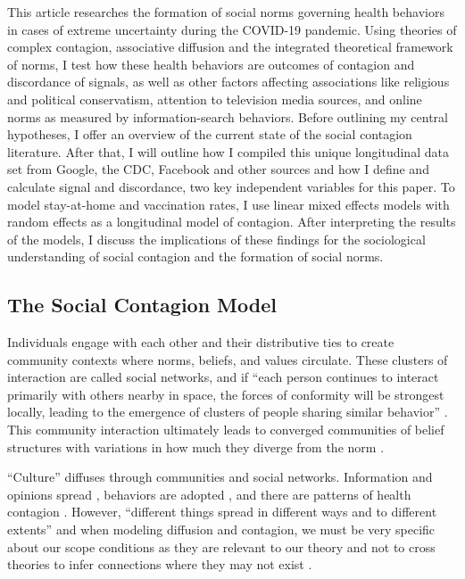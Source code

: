 This article researches the formation of social norms governing health behaviors
in cases of extreme uncertainty during the COVID-19 pandemic. Using theories of
complex contagion, associative diffusion and the integrated theoretical
framework of norms, I test how these health behaviors are outcomes of contagion
and discordance of signals, as well as other factors affecting associations like
religious and political conservatism, attention to television media sources, and
online norms as measured by information-search behaviors. Before outlining my
central hypotheses, I offer an overview of the current state of the social
contagion literature. After that, I will outline how I compiled this unique
longitudinal data set from Google, the CDC, Facebook and other sources and how I
define and calculate signal and discordance, two key independent variables for
this paper. To model stay-at-home and vaccination rates, I use linear mixed
effects models with random effects as a longitudinal model of contagion. After
interpreting the results of the models, I discuss the implications of these
findings for the sociological understanding of social contagion and the
formation of social norms.

\hypertarget{the-social-contagion-model}{\subsection{The Social Contagion Model}\label{the-social-contagion-model}}

Individuals engage with each other and their distributive ties to create
community contexts where norms, beliefs, and values circulate. These clusters of
interaction are called social networks, and if ``each person continues to
interact primarily with others nearby in space, the forces of conformity will be
strongest locally, leading to the emergence of clusters of people sharing
similar behavior'' \citep{kitts_shi18}. This community interaction ultimately
leads to converged communities of belief structures with variations in how much
they diverge from the norm \citep{cullumCulturalEvolutionInterpersonal2007,
lataneExperimentalEvidenceDynamic1996, okadaStructureCulturalRejection2017}.

``Culture'' diffuses through communities and social networks. Information and
opinions spread \citep{bond_etal12,
fowler2010cooperative,klarEffectNetworkStructure2017}, behaviors are adopted
\citep{aralExerciseContagionGlobal2017, centolaSpreadBehaviorOnline2010,
centolaExperimentalStudyHomophily2011,christakis2008collective,rosenquist2010spread},
and there are patterns of health contagion
\citep{cacioppo2009alone,christakisSpreadObesityLarge2007}. However, ``different
things spread in different ways and to different extents'' \citep[p.
563]{christakisSocialContagionTheory2013} and when modeling diffusion and
contagion, we must be very specific about our scope conditions as they are
relevant to our theory and not to cross theories to infer connections where they
may not exist \citep{kitts_quintane20}.

